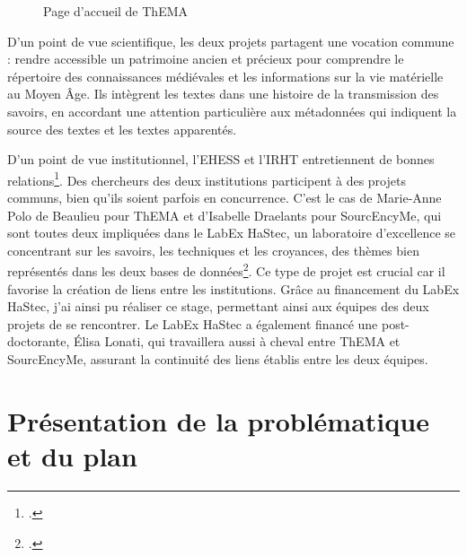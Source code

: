 \documentclass[a4paper,12pt,twoside]{book} %
\begin{document}
\vspace{10pt} %

\begin{figure}[H]
	\centering
	\caption{Page d'accueil de ThEMA}
\end{figure}

D'un point de vue scientifique, les deux projets partagent une vocation commune : rendre accessible un patrimoine ancien et précieux pour comprendre le répertoire des connaissances médiévales et les informations sur la vie matérielle au Moyen Âge. Ils intègrent les textes dans une histoire de la transmission des savoirs, en accordant une attention particulière aux métadonnées qui indiquent la source des textes et les textes apparentés.

D'un point de vue institutionnel, l'EHESS et l'IRHT entretiennent de bonnes relations\footcite{holtzInstitutRechercheHistoire2005}. Des chercheurs des deux institutions participent à des projets communs, bien qu'ils soient parfois en concurrence. C'est le cas de Marie-Anne Polo de Beaulieu pour ThEMA et d'Isabelle Draelants pour SourcEncyMe, qui sont toutes deux impliquées dans le LabEx HaStec, un laboratoire d'excellence se concentrant sur les savoirs, les techniques et les croyances, des thèmes bien représentés dans les deux bases de données\footcite{LabexHastecEPHE}. Ce type de projet est crucial car il favorise la création de liens entre les institutions. Grâce au financement du LabEx HaStec, j'ai ainsi pu réaliser ce stage, permettant ainsi aux équipes des deux projets de se rencontrer. Le LabEx HaStec a également financé une post-doctorante, Élisa Lonati, qui travaillera aussi à cheval entre ThEMA et SourcEncyMe, assurant la continuité des liens établis entre les deux équipes.

\section{Présentation de la problématique et du plan}
\end{document}
